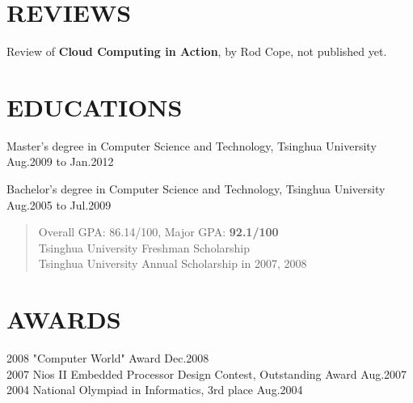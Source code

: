 \documentclass[11pt]{res} %
\begin{document}
\begin{resume}
\section{REVIEWS}
Review of \textbf{Cloud Computing in Action}, by Rod Cope, not published yet.

\section{EDUCATIONS}
Master's degree in Computer Science and Technology, Tsinghua University \\
\hspace*{\fill} Aug.2009 to Jan.2012

Bachelor's degree in Computer Science and Technology, Tsinghua University \\
\hspace*{\fill} Aug.2005 to Jul.2009
\begin{quote}
Overall GPA: 86.14/100, Major GPA: \textbf{92.1/100} \\
Tsinghua University Freshman Scholarship \\
Tsinghua University Annual Scholarship in 2007, 2008 \\
\end{quote}

\section{AWARDS}
2008 "Computer World" Award \hfill Dec.2008 \\
2007 Nios II Embedded Processor Design Contest, Outstanding Award \hfill Aug.2007 \\
2004 National Olympiad in Informatics, 3rd place \hfill Aug.2004

\end{resume}
\end{document}
